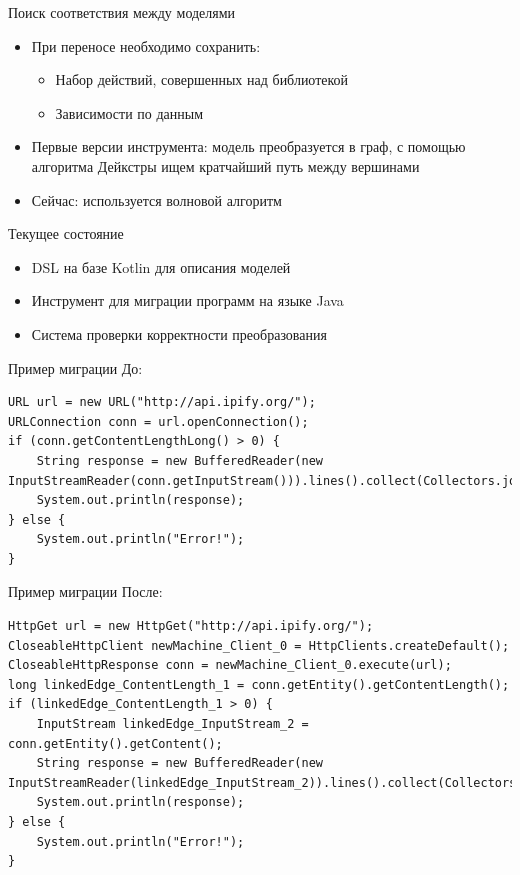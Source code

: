 \documentclass[12pt]{beamer}
\begin{document}
\begin{frame}[fragile]{Поиск соответствия между моделями}
  \begin{mybox}[]
  \begin{itemize}
  	\item При переносе необходимо сохранить:
  	  \begin{itemize}
  	  	\item Набор действий, совершенных над библиотекой
  	  	\item Зависимости по данным
  	  \end{itemize}
  	\item Первые версии инструмента: модель преобразуется в граф, с помощью алгоритма Дейкстры ищем кратчайший путь между вершинами
  	\item Сейчас: используется волновой алгоритм
  \end{itemize}
  \end{mybox}
\end{frame}

\begin{frame}[fragile]{Текущее состояние}
  \begin{mybox}[]
  \begin{itemize}
  	\item DSL на базе Kotlin для описания моделей
  	\item Инструмент для миграции программ на языке Java
  	\item Система проверки корректности преобразования
  \end{itemize}
  \end{mybox}
\end{frame}

\begin{frame}[fragile]{Пример миграции}
До:
\begin{lstlisting}
URL url = new URL("http://api.ipify.org/");
URLConnection conn = url.openConnection();
if (conn.getContentLengthLong() > 0) {
    String response = new BufferedReader(new InputStreamReader(conn.getInputStream())).lines().collect(Collectors.joining("\n"));
    System.out.println(response);
} else {
    System.out.println("Error!");
}
\end{lstlisting}
\end{frame}

\begin{frame}[fragile]{Пример миграции}
После:
\begin{lstlisting}
HttpGet url = new HttpGet("http://api.ipify.org/");
CloseableHttpClient newMachine_Client_0 = HttpClients.createDefault();
CloseableHttpResponse conn = newMachine_Client_0.execute(url);
long linkedEdge_ContentLength_1 = conn.getEntity().getContentLength();
if (linkedEdge_ContentLength_1 > 0) {
    InputStream linkedEdge_InputStream_2 = conn.getEntity().getContent();
    String response = new BufferedReader(new InputStreamReader(linkedEdge_InputStream_2)).lines().collect(Collectors.joining("\n"));
    System.out.println(response);
} else {
    System.out.println("Error!");
}
\end{lstlisting}
\end{frame}
\end{document}
